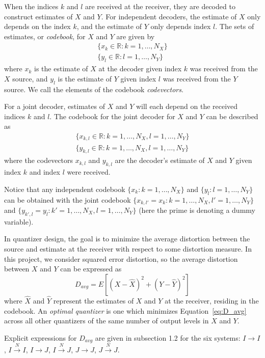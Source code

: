 \documentclass[10pt]{article}
\newcommand{\real}{\mathbb{R}}
\newcommand{\sysIIN}{\mbox{$I \overset{N}{\rightarrow} I$}}
\newcommand{\sysII}{\mbox{$I \rightarrow I$}}
\newcommand{\sysIJN}{\mbox{$I \overset{N}{\rightarrow} J$}}
\newcommand{\sysIJ}{\mbox{$I \rightarrow J$}}
\newcommand{\sysJJN}{\mbox{$J \overset{N}{\rightarrow} J$}}
\newcommand{\sysJJ}{\mbox{$J \rightarrow J$}}
\begin{document}
When the indices $k$ and $l$ are received at the receiver, they are decoded to construct estimates of $X$ and $Y$. For independent decoders, the estimate of $X$ only depends on the index $k$, and the estimate of $Y$ only depends index $l$. The sets of estimates, or \emph{codebook}, for $X$ and $Y$ are given by
\begin{gather*}
    \{x_k \in \real : k = 1,\ldots,N_X\} \\
    \{y_l \in \real : l = 1,\ldots,N_Y\}
\end{gather*}
where $x_k$ is the estimate of $X$ at the decoder given index $k$ was received from the $X$ source, and $y_l$ is the estimate of $Y$ given index $l$ was received from the $Y$ source. We call the elements of the codebook \emph{codevectors}.

For a joint decoder, estimates of $X$ and $Y$ will each depend on the received indices $k$ and $l$. The codebook for the joint decoder for $X$ and $Y$ can be described as
\begin{gather*}
    \{x_{k,l} \in \real : k = 1,\ldots,N_X, l = 1,\ldots,N_Y\} \\
    \{y_{k,l} \in \real : k = 1,\ldots,N_X, l = 1,\ldots,N_Y\}
\end{gather*}
where the codevectors $x_{k,l}$ and $y_{k,l}$ are the decoder's estimate of $X$ and $Y$ given index $k$ and index $l$ were received.

Notice that any independent codebook $\{x_k : k = 1,\ldots,N_X\}$ and $\{y_l : l = 1,\ldots,N_Y\}$ can be obtained with the joint codebook $\{x_{k,l'}=x_k : k=1,\ldots,N_X, l'=1,\ldots,N_Y\}$ and $\{y_{k',l}=y_l : k'=1,\ldots,N_X, l=1,\ldots,N_Y\}$ (here the prime is denoting a dummy variable).

In quantizer design, the goal is to minimize the average distortion between the source and estimate at the receiver with respect to some distortion measure. In this project, we consider squared error distortion, so the average distortion between $X$ and $Y$ can be expressed as
\begin{equation}
    \label{eq:D_avg}
    D_{avg} = E[{(X-\hat{X})}^2 + {(Y-\hat{Y})}^2]
\end{equation}
where $\hat{X}$ and $\hat{Y}$ represent the estimates of $X$ and $Y$ at the receiver, residing in the codebook. An \emph{optimal quantizer} is one which minimizes Equation~\ref{eq:D_avg} across all other quantizers of the same number of output levels in $X$ and $Y$.

Explicit expressions for $D_{avg}$ are given in subsection 1.2 for the six systems: \sysII, \sysIIN, \sysIJ, \sysIJN, \sysJJ, \sysJJN\@.
\end{document}
